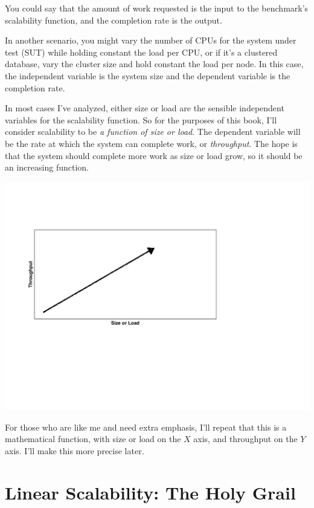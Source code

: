 \documentclass{vivid_layout}
\begin{document}
You could say that the amount of work requested is the input to the benchmark's
scalability function, and the completion rate is the output.

In another scenario, you might vary the number of CPUs for the system under test
(SUT) while holding constant the load per CPU, or if it's a clustered database,
vary the cluster size and hold constant the load per node. In this case, the
independent variable is the system size and the dependent variable is the
completion rate.

In most cases I've analyzed, either size or load are the sensible
independent variables for the scalability function. So for the purposes of this
book, I'll consider scalability to be {\itshape a function of size or load}.
The dependent variable will be the rate at which the system can complete work,
or {\itshape throughput}. The hope is that the system should complete more work
as size or load grow, so it should be an increasing function.
\begin{center}
\includegraphics[width=.85\linewidth]{scalability/size-vs-load}
\end{center}

For those who are like me and need extra emphasis, I'll repeat that this is a
mathematical function, with size or load on the $X$ axis, and throughput on the
$Y$ axis. I'll make this more precise later.

\section{Linear Scalability: The Holy Grail}
\end{document}

